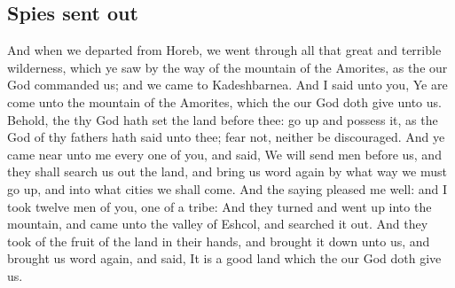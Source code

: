 \begin{biblechapter}
\section*{Spies sent out}
\verse And when we departed from Horeb, we went through all that great and terrible wilderness, which ye saw by the way of the mountain of the Amorites, as the \LORD our God commanded us; and we came to Kadeshbarnea.
\verse And I said unto you, Ye are come unto the mountain of the Amorites, which the \LORD our God doth give unto us.
\verse Behold, the \LORD thy God hath set the land before thee: go up and possess it, as the \LORD God of thy fathers hath said unto thee; fear not, neither be discouraged.
\verse And ye came near unto me every one of you, and said, We will send men before us, and they shall search us out the land, and bring us word again by what way we must go up, and into what cities we shall come.
\verse And the saying pleased me well: and I took twelve men of you, one of a tribe:
\verse And they turned and went up into the mountain, and came unto the valley of Eshcol, and searched it out.
\verse And they took of the fruit of the land in their hands, and brought it down unto us, and brought us word again, and said, It is a good land which the \LORD our God doth give us.

\end{biblechapter}
